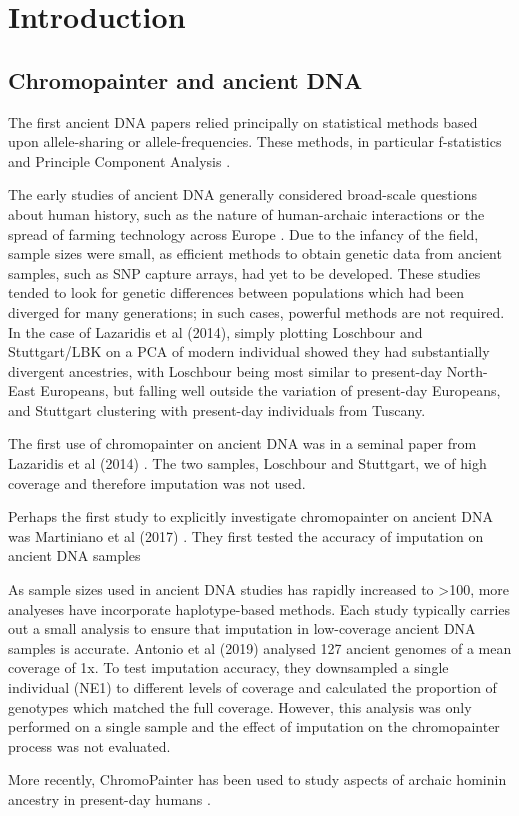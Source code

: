 \chapter{Introduction}

\section{Chromopainter and ancient DNA}

The first ancient DNA papers relied principally on statistical methods based upon allele-sharing or allele-frequencies. These methods, in particular f-statistics \cite{Green2010, Patterson2012, peter2016admixture} and Principle Component Analysis \cite{price2006principal}. 

The early studies of ancient DNA generally considered broad-scale questions about human history, such as the nature of human-archaic interactions or the spread of farming technology across Europe \cite{Lazaridis2014}. Due to the infancy of the field, sample sizes were small, as efficient methods to obtain genetic data from ancient samples, such as SNP capture arrays, had yet to be developed. These studies tended to look for genetic differences between populations which had been diverged for many generations; in such cases, powerful methods are not required. In the case of Lazaridis et al (2014), simply plotting Loschbour and Stuttgart/LBK on a PCA of modern individual showed they had substantially divergent ancestries, with Loschbour being most similar to present-day North-East Europeans, but falling well outside the variation of present-day Europeans, and Stuttgart clustering with present-day individuals from Tuscany. 



The first use of chromopainter on ancient DNA was in a seminal paper from Lazaridis et al (2014) \cite{Lazaridis2014}. The two samples, Loschbour and Stuttgart, we of high coverage and therefore imputation was not used.

Perhaps the first study to explicitly investigate chromopainter on ancient DNA was Martiniano et al (2017) \cite{Martiniano2017}. They first tested the accuracy of imputation on ancient DNA samples 

As sample sizes used in ancient DNA studies has rapidly increased to >100, more analyeses have incorporate haplotype-based methods. Each study typically carries out a small analysis to ensure that imputation in low-coverage ancient DNA samples is accurate. Antonio et al (2019) \cite{antonio2019ancient} analysed 127 ancient genomes of a mean coverage of 1x. To test imputation accuracy, they downsampled a single individual (NE1) to different levels of coverage and calculated the proportion of genotypes which matched the full coverage. However, this analysis was only performed on a single sample and the effect of imputation on the chromopainter process was not evaluated. 

More recently, ChromoPainter has been used to study aspects of archaic hominin ancestry in present-day humans \cite{JACOBS20191010, teixeira2021widespread}. 